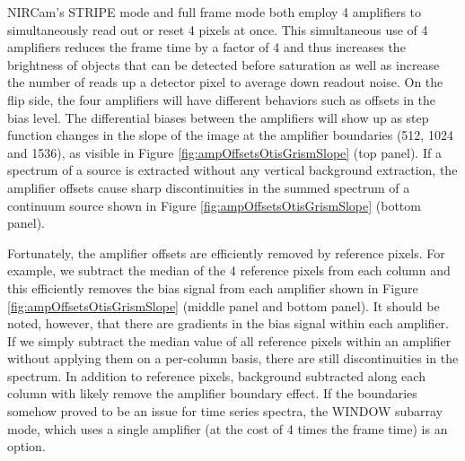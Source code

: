 \documentclass{aastex62}
\begin{document}
NIRCam's STRIPE mode and full frame mode both employ 4 amplifiers to simultaneously read out or reset 4 pixels at once.
This simultaneous use of 4 amplifiers reduces the frame time by a factor of 4 and thus increases the brightness of objects that can be detected before saturation as well as increase the number of reads up a detector pixel to average down readout noise.
On the flip side, the four amplifiers will have different behaviors such as offsets in the bias level.
The differential biases between the amplifiers will show up as step function changes in the slope of the image at the amplifier boundaries (512, 1024 and 1536), as visible in Figure \ref{fig:ampOffsetsOtisGrismSlope} (top panel).
If a spectrum of a source is extracted without any vertical background extraction, the amplifier offsets cause sharp discontinuities in the summed spectrum of a continuum source shown in Figure \ref{fig:ampOffsetsOtisGrismSlope} (bottom panel).

Fortunately, the amplifier offsets are efficiently removed by reference pixels.
For example, we subtract the median of the 4 reference pixels from each column and this efficiently removes the bias signal from each amplifier shown in Figure \ref{fig:ampOffsetsOtisGrismSlope} (middle panel and bottom panel).
It should be noted, however, that there are gradients in the bias signal within each amplifier. If we simply subtract the median value of all reference pixels within an amplifier without applying them on a per-column basis, there are still discontinuities in the spectrum.
In addition to reference pixels, background subtracted along each column with likely remove the amplifier boundary effect.
If the boundaries somehow proved to be an issue for time series spectra, the WINDOW subarray mode, which uses a single amplifier (at the cost of 4 times the frame time) is an option.
\end{document}
